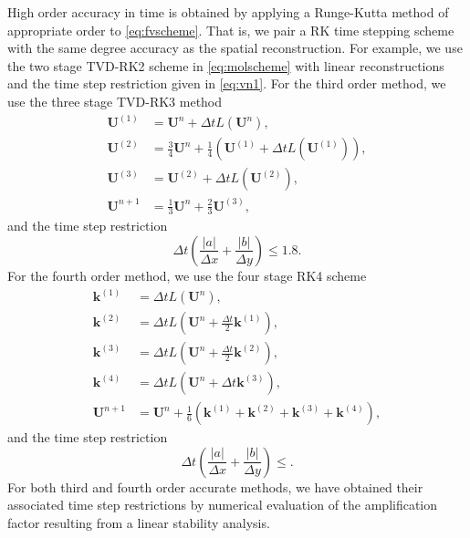 High order accuracy in time is obtained by applying a Runge-Kutta method of appropriate order to \eqref{eq:fvscheme}.  
That is, we pair a RK time stepping scheme with the same degree accuracy as the spatial reconstruction.  For example, we use the two stage TVD-RK2 scheme in \eqref{eq:molscheme} with linear reconstructions and the time step restriction given in \eqref{eq:vn1}.
For the third order method, we use the three stage TVD-RK3 method
\begin{equation}\label{eq:molscheme_ho2}
\begin{aligned}
\mathbf{U}^{(1)} &= \mathbf{U}^{n} + \Delta t L(\mathbf{U}^n), \\
\mathbf{U}^{(2)} &=  \frac{3}{4}\mathbf{U}^{n} + \frac{1}{4}(\mathbf{U}^{(1)} + \Delta t L(\mathbf{U}^{(1)})), \\
\mathbf{U}^{(3)} &= \mathbf{U}^{(2)} + \Delta t L(\mathbf{U}^{(2)}),  \\
\mathbf{U}^{n+1} &= \frac{1}{3}\mathbf{U}^{n} + \frac{2}{3}\mathbf{U}^{(3)}  ,	
\end{aligned}
\end{equation}
and the time step restriction
\begin{equation}
\Delta t \left( \frac{|a|}{\Delta x} + \frac{|b|}{\Delta y} \right) \leq 1.8.
\end{equation}
For the fourth order method, we use the four stage RK4 scheme
\begin{equation}\label{eq:molscheme_ho4}
\begin{aligned}
\mathbf{k}^{(1)} &= \Delta t L(\mathbf{U}^n), \\
\mathbf{k}^{(2)} &= \Delta t L \left(\mathbf{U}^n + \frac{\Delta t}{2} \mathbf{k}^{(1)} \right), \\	
\mathbf{k}^{(3)} &= \Delta t L \left(\mathbf{U}^n + \frac{\Delta t}{2} \mathbf{k}^{(2)} \right), \\	
\mathbf{k}^{(4)} &= \Delta t L \left(\mathbf{U}^n + \Delta t \mathbf{k}^{(3)} \right), \\	
\mathbf{U}^{n+1} &=\mathbf{U}^n + \frac{1}{6}(\mathbf{k}^{(1)} + \mathbf{k}^{(2)}+ \mathbf{k}^{(3)}+ \mathbf{k}^{(4)}),
\end{aligned}
\end{equation}
and the time step restriction
\begin{equation}
\Delta t \left( \frac{|a|}{\Delta x} + \frac{|b|}{\Delta y} \right) \leq .
\end{equation}
For both third and fourth order accurate methods, we have obtained their associated time step restrictions by numerical evaluation of the amplification factor resulting from a linear stability analysis.
